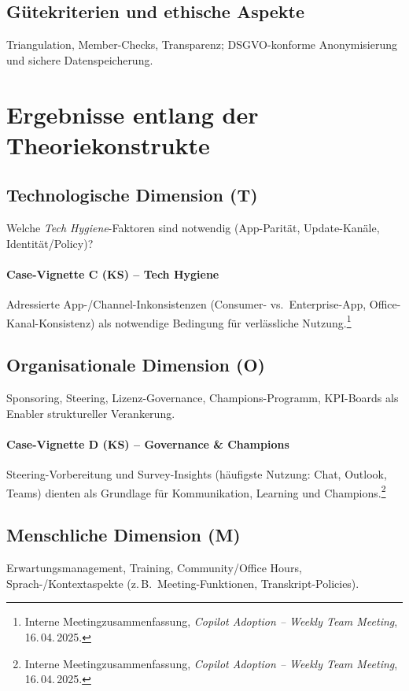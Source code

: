 \documentclass[12pt,a4paper,oneside]{article} %
\begin{document}
\subsection{Gütekriterien und ethische Aspekte}
Triangulation, Member-Checks, Transparenz; DSGVO-konforme Anonymisierung und sichere Datenspeicherung.


\section{Ergebnisse entlang der Theoriekonstrukte}
\subsection{Technologische Dimension (T)}
Welche \emph{Tech Hygiene}-Faktoren sind notwendig (App-Parität, Update-Kanäle, Identität/Policy)? 
\paragraph{Case-Vignette C (KS) – Tech Hygiene}
Adressierte App-/Channel-Inkonsistenzen (Consumer- vs.\ Enterprise-App, Office-Kanal-Konsistenz) als notwendige Bedingung für verlässliche Nutzung.\footnote{Interne Meetingzusammenfassung, \emph{Copilot Adoption – Weekly Team Meeting}, 16.\,04.\,2025.}

\subsection{Organisationale Dimension (O)}
Sponsoring, Steering, Lizenz-Governance, Champions-Programm, KPI-Boards als Enabler struktureller Verankerung.
\paragraph{Case-Vignette D (KS) – Governance \& Champions}
Steering-Vorbereitung und Survey-Insights (häufigste Nutzung: Chat, Outlook, Teams) dienten als Grundlage für Kommunikation, Learning und Champions.\footnote{Interne Meetingzusammenfassung, \emph{Copilot Adoption – Weekly Team Meeting}, 16.\,04.\,2025.}

\subsection{Menschliche Dimension (M)}
Erwartungsmanagement, Training, Community/Office Hours, Sprach-/Kontextaspekte (z.\,B.\ Meeting-Funktionen, Transkript-Policies).
\end{document}
